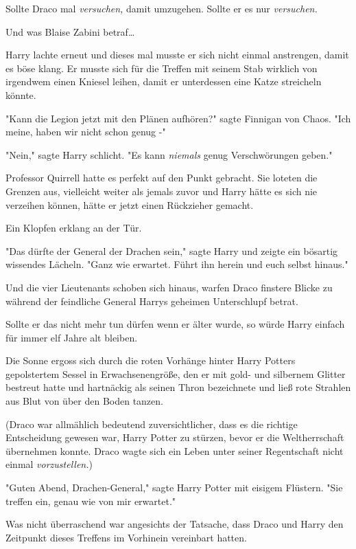 {Sollte Draco mal \emph{versuchen,} damit umzugehen. Sollte er es nur \emph{versuchen.}

Und was Blaise Zabini betraf…

Harry lachte erneut und dieses mal musste er sich nicht einmal anstrengen, damit es böse klang. Er musste sich für die Treffen mit seinem Stab wirklich von irgendwem einen Kniesel leihen, damit er unterdessen eine Katze streicheln könnte.

"Kann die Legion jetzt mit den Plänen aufhören?" sagte Finnigan von Chaos. "Ich meine, haben wir nicht schon genug -"

"Nein," sagte Harry schlicht. "Es kann \emph{niemals} genug Verschwörungen geben."

Professor Quirrell hatte es perfekt auf den Punkt gebracht. Sie loteten die Grenzen aus, vielleicht weiter als jemals zuvor und Harry hätte es sich nie verzeihen können, hätte er jetzt einen Rückzieher gemacht.

Ein Klopfen erklang an der Tür.

"Das dürfte der General der Drachen sein," sagte Harry und zeigte ein bösartig wissendes Lächeln. "Ganz wie erwartet. Führt ihn herein und euch selbst hinaus."

Und die vier Lieutenants schoben sich hinaus, warfen Draco finstere Blicke zu während der feindliche General Harrys geheimen Unterschlupf betrat.

Sollte er das nicht mehr tun dürfen wenn er älter wurde, so würde Harry einfach für immer elf Jahre alt bleiben.

\later

Die Sonne ergoss sich durch die roten Vorhänge hinter Harry Potters gepolstertem Sessel in Erwachsenengröße, den er mit gold- und silbernem Glitter bestreut hatte und hartnäckig als seinen Thron bezeichnete und ließ rote Strahlen aus Blut von über den Boden tanzen.

(Draco war allmählich bedeutend zuversichtlicher, dass es die richtige Entscheidung gewesen war, Harry Potter zu stürzen, bevor er die Weltherrschaft übernehmen konnte. Draco wagte sich ein Leben unter seiner Regentschaft nicht einmal \emph{vorzustellen.})

"Guten Abend, Drachen-General," sagte Harry Potter mit eisigem Flüstern. "Sie treffen ein, genau wie von mir erwartet."

Was nicht überraschend war angesichts der Tatsache, dass Draco und Harry den Zeitpunkt dieses Treffens im Vorhinein vereinbart hatten.

}
